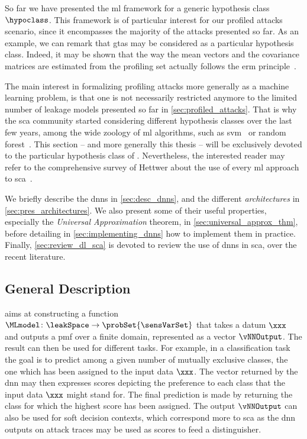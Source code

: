 So far we have presented the \gls{ml} framework for a generic hypothesis class \(\hypoclass\).
This framework is of particular interest for our profiled attacks scenario, since it encompasses the majority of the attacks presented so far.
As an example, we can remark that \glspl{gta} may be considered as a particular hypothesis class.
Indeed, it may be shown that the way the mean vectors and the covariance matrices are estimated from the profiling set actually follows the \gls{erm} principle~\cite{goodfellow_deep_2017}.

The main interest in formalizing profiling attacks more generally as a machine learning problem, is that one is not necessarily restricted anymore to the limited number of leakage models presented so far in \autoref{sec:profiled_attacks}.
That is why the \gls{sca} community started considering different hypothesis classes over the last few years, among the wide zoology of \gls{ml} algorithms, such as \gls{svm}~\cite{cortes_svm_1995} or random forest~\cite{breiman_random_2001,picek_performance_2018}.
This section -- and more generally this thesis -- will be exclusively devoted to the particular hypothesis class of .
Nevertheless, the interested reader may refer to the comprehensive survey of Hettwer \etal{} about the use of every \gls{ml} approach to \gls{sca}~\cite{hettwer_applications_2020}.

We briefly describe the \glspl{dnn} in \autoref{sec:desc_dnns}, and the different \emph{architectures} in \autoref{sec:pres_architectures}.
We also present some of their useful properties, especially the \emph{Universal Approximation} theorem, in \autoref{sec:universal_approx_thm}, before detailing in \autoref{sec:implementing_dnns} how to implement them in practice.
Finally, \autoref{sec:review_dl_sca} is devoted to review the use of \glspl{dnn} in \gls{sca}, over the recent literature.


\subsection{General Description}
\label{sec:desc_dnns}
 aims at constructing a function \(\MLmodel \colon \leakSpace \rightarrow \probSet{\sensVarSet}\) that takes a datum \(\xxx\) and outputs a \gls{pmf} over a finite domain, represented as a vector \(\vNNOutput\).
The result can then be used for different tasks.
For example, in a classification task the goal is to predict among a given number of mutually exclusive classes, the one which has been assigned to the input data \(\xxx\).
The vector returned by the \gls{dnn} may then expresses scores depicting the preference to each class that the input data \(\xxx\) might stand for.
The final prediction is made by returning the class for which the highest score has been assigned.
The output \(\vNNOutput\) can also be used for soft decision contexts, which correspond more to \gls{sca} as the \gls{dnn} outputs on attack traces may be used as scores to feed a distinguisher.

